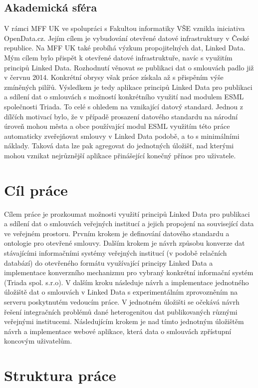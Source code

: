 \subsection*{Akademická sféra}

V rámci MFF UK ve spolupráci s Fakultou informatiky VŠE vznikla iniciativa OpenData.cz. Jejím cílem je vybudování otevřené datové infrastruktury v České republice. Na MFF UK také probíhá výzkum propojitelných dat, Linked Data. Mým cílem bylo přispět k otevřené datové infrastruktuře, navíc s využitím principů Linked Data. Rozhodnutí věnovat se publikaci dat o smlouvách padlo již v červnu 2014. Konkrétní obrysy však práce získala až s přispěním výše zmíněných pilířů.
\noindent
Výsledkem je tedy aplikace principů Linked Data pro publikaci a sdílení dat o smlouvách s možností konkrétního využití nad modulem ESML společnosti Triada. To celé s ohledem na vznikající datový standard. Jednou z dílčích motivací bylo, že v případě prosazení datového standardu na národní úroveň mohou města a obce používající modul ESML využitím této práce automaticky zveřejňovat smlouvy v Linked Data podobě, a to s minimálními náklady. Taková data lze pak agregovat do jednotných úložišť, nad kterými mohou vznikat nejrůznější aplikace přinášející konečný přínos pro uživatele.

\section{Cíl práce}

Cílem práce je prozkoumat možnosti využití principů Linked Data pro publikaci a sdílení dat o smlouvách veřejných institucí a jejich propojení na související data ve veřejném prostoru. Prvním krokem je definování datového standardu a ontologie pro otevřené smlouvy. Dalším krokem je návrh způsobu konverze dat stávajícími informačními systémy veřejných institucí (v podobě relačních databází) do otevřeného formátu využívající principy Linked Data a implementace konverzního mechanizmu pro vybraný konkrétní informační systém (Triada spol. s.r.o). V dalším kroku následuje návrh a implementace jednotného úložiště dat o smlouvách v Linked Data s experimentálním zprovozněním na serveru poskytnutém vedoucím práce. V jednotném úložišti se očekává návrh řešení integračních problémů dané heterogenitou dat publikovaných různými veřejnými institucemi. Následujícím krokem je nad tímto jednotným úložištěm návrh a implementace webové aplikace, která data o smlouvách zpřístupní koncovým uživatelům.

\section{Struktura práce}

